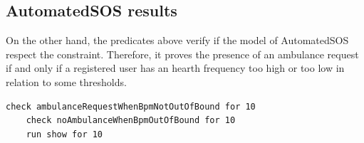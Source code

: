     \begin{figure}[H]
        \centering
        \caption{ }
        \label{ fig:D4H-single-model }
    \end{figure}
    
    \begin{figure}[H]
        \centering
        \caption{ }
        \label{ fig:D4H-multiple-model }
    \end{figure}

    \subsection{AutomatedSOS results}
    On the other hand, the predicates above verify if the model of AutomatedSOS respect the constraint. Therefore, it proves the presence of an ambulance request if and only if a registered user has an hearth frequency too high or too low in relation to some thresholds.\\
    
\begin{lstlisting}[language=alloy]
    check ambulanceRequestWhenBpmNotOutOfBound for 10
    check noAmbulanceWhenBpmOutOfBound for 10
    run show for 10
\end{lstlisting}

